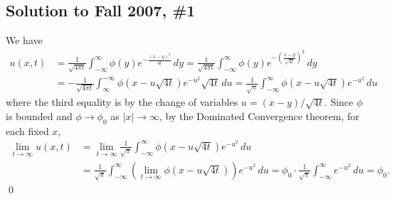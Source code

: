 \subsection*{Solution to Fall 2007, \#1}\label{f071}
We have
\begin{align*}
u(x, t) &= \frac{1}{\sqrt{4\pi t}}\int_{-\infty}^{\infty}\phi(y)e^{-\frac{(x - y)^{2}}{4t}}\, dy = \frac{1}{\sqrt{4\pi t}}\int_{-\infty}^{\infty}\phi(y)e^{-(\frac{x - y}{\sqrt{4t}})^{2}}\, dy\\
& = -\frac{1}{\sqrt{4\pi t}}\int_{\infty}^{-\infty}\phi(x - u\sqrt{4t})e^{-u^{2}}\sqrt{4t}\, du = \frac{1}{\sqrt{\pi}}\int_{-\infty}^{\infty}\phi(x - u\sqrt{4t})e^{-u^{2}}\, du
\end{align*}
where the third equality is by the change of variables $u = (x - y)/\sqrt{4t}$. Since $\phi$ is bounded and $\phi \rightarrow \phi_{0}$ as $|x| \rightarrow \infty$,
by the Dominated Convergence theorem, for each fixed $x$,
\begin{align*}
\lim_{t \rightarrow \infty}u(x, t) &= \lim_{t \rightarrow \infty}\frac{1}{\sqrt{\pi}}\int_{-\infty}^{\infty}\phi(x - u\sqrt{4t})e^{-u^{2}}\, du\\
& = \frac{1}{\sqrt{\pi}}\int_{-\infty}^{\infty}(\lim_{t \rightarrow \infty}\phi(x - u\sqrt{4t}))e^{-u^{2}}\, du = \phi_{0}\cdot \frac{1}{\sqrt{\pi}}\int_{-\infty}^{\infty}e^{-u^{2}}\, du = \phi_{0}.
\end{align*}
\hfill\qed

